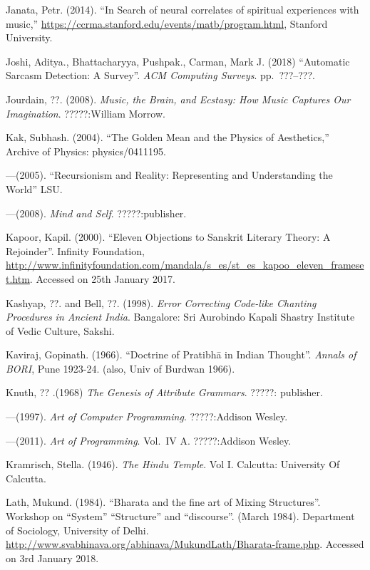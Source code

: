 \begin{thebibliography}{99}
Janata, Petr. (2014). “In Search of neural correlates of spiritual experiences with music,” \url{https://ccrma.stanford.edu/events/matb/program.html}, Stanford University.

Joshi, Aditya., Bhattacharyya, Pushpak., Carman, Mark J. (2018) “Automatic Sarcasm Detection: A Survey”. \textsl{ACM Computing Surveys}. pp.~???--???.

Jourdain, ??. (2008). \textsl{Music, the Brain, and Ecstasy: How Music Captures Our Imagination}. ?????:William Morrow.

Kak, Subhash. (2004). “The Golden Mean and the Physics of Aesthetics,” Archive of Physics: physics/0411195.

---\kern3pt(2005). “Recursionism and Reality: Representing and Understanding the World” LSU.

---\kern3pt(2008). \textsl{Mind and Self}. ?????:publisher.

Kapoor, Kapil. (2000). “Eleven Objections to Sanskrit Literary Theory: A Rejoinder”. Infinity Foundation, \url{http://www.infinityfoundation.com/mandala/s_es/st_es_kapoo_eleven_frameset.htm}. Accessed on 25th January 2017.

Kashyap, ??. and Bell, ??. (1998). \textsl{Error Correcting Code-like Chanting Procedures in Ancient India}. Bangalore: Sri Aurobindo Kapali Shastry Institute of Vedic Culture, Sakshi.

Kaviraj, Gopinath. (1966). “Doctrine of Pratibhā in Indian Thought”. \textsl{Annals of BORI}, Pune 1923-24. (also, Univ of Burdwan 1966).

Knuth, ?? .(1968) \textsl{The Genesis of Attribute Grammars}. ?????: publisher.

---\kern3pt(1997). \textsl{Art of Computer Programming}. ?????:Addison Wesley.

---\kern3pt(2011). \textsl{Art of Programming}. Vol.~IV A. ?????:Addison Wesley.

Kramrisch, Stella. (1946). \textsl{The Hindu Temple}. Vol I. Calcutta: University Of Calcutta.

Lath, Mukund. (1984). “Bharata and the fine art of Mixing Structures”. Workshop on “System” “Structure” and “discourse”. (March 1984). Department of Sociology, University of Delhi. \url{http://www.svabhinava.org/abhinava/MukundLath/Bharata-frame.php}. Accessed on 3rd January 2018.


\end{thebibliography}

